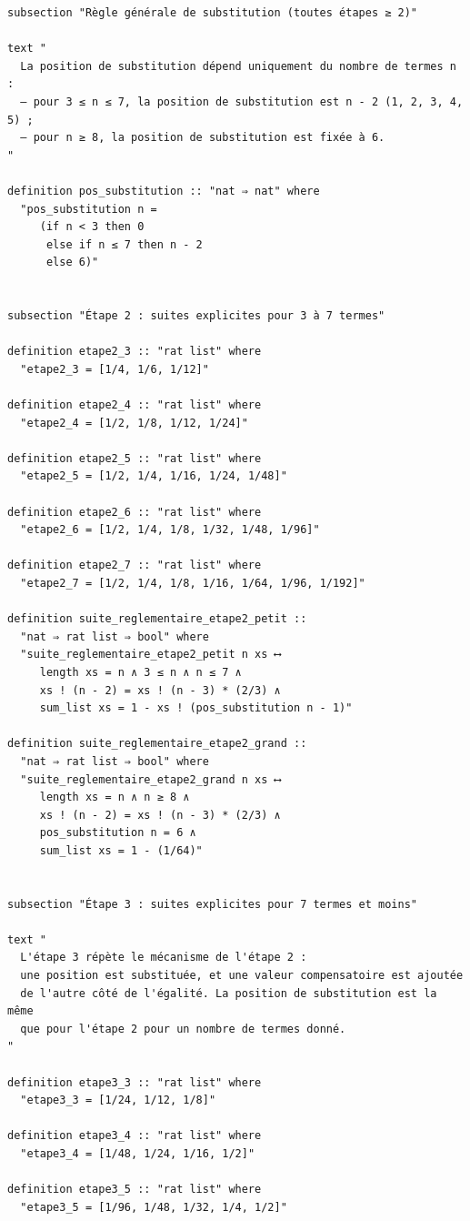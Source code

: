 \documentclass[a4paper,11pt]{article}
\begin{document}
\begin{holcode}[title={\textcolor{white}{File: methode\_de\_philippot.thy -- COMPLETE}}]
\begin{lstlisting}
subsection "Règle générale de substitution (toutes étapes ≥ 2)"

text "
  La position de substitution dépend uniquement du nombre de termes n :
  – pour 3 ≤ n ≤ 7, la position de substitution est n - 2 (1, 2, 3, 4, 5) ;
  – pour n ≥ 8, la position de substitution est fixée à 6.
"

definition pos_substitution :: "nat ⇒ nat" where
  "pos_substitution n =
     (if n < 3 then 0
      else if n ≤ 7 then n - 2
      else 6)"


subsection "Étape 2 : suites explicites pour 3 à 7 termes"

definition etape2_3 :: "rat list" where
  "etape2_3 = [1/4, 1/6, 1/12]"

definition etape2_4 :: "rat list" where
  "etape2_4 = [1/2, 1/8, 1/12, 1/24]"

definition etape2_5 :: "rat list" where
  "etape2_5 = [1/2, 1/4, 1/16, 1/24, 1/48]"

definition etape2_6 :: "rat list" where
  "etape2_6 = [1/2, 1/4, 1/8, 1/32, 1/48, 1/96]"

definition etape2_7 :: "rat list" where
  "etape2_7 = [1/2, 1/4, 1/8, 1/16, 1/64, 1/96, 1/192]"

definition suite_reglementaire_etape2_petit ::
  "nat ⇒ rat list ⇒ bool" where
  "suite_reglementaire_etape2_petit n xs ⟷
     length xs = n ∧ 3 ≤ n ∧ n ≤ 7 ∧
     xs ! (n - 2) = xs ! (n - 3) * (2/3) ∧
     sum_list xs = 1 - xs ! (pos_substitution n - 1)"

definition suite_reglementaire_etape2_grand ::
  "nat ⇒ rat list ⇒ bool" where
  "suite_reglementaire_etape2_grand n xs ⟷
     length xs = n ∧ n ≥ 8 ∧
     xs ! (n - 2) = xs ! (n - 3) * (2/3) ∧
     pos_substitution n = 6 ∧
     sum_list xs = 1 - (1/64)"


subsection "Étape 3 : suites explicites pour 7 termes et moins"

text "
  L'étape 3 répète le mécanisme de l'étape 2 :
  une position est substituée, et une valeur compensatoire est ajoutée
  de l'autre côté de l'égalité. La position de substitution est la même
  que pour l'étape 2 pour un nombre de termes donné.
"

definition etape3_3 :: "rat list" where
  "etape3_3 = [1/24, 1/12, 1/8]"

definition etape3_4 :: "rat list" where
  "etape3_4 = [1/48, 1/24, 1/16, 1/2]"

definition etape3_5 :: "rat list" where
  "etape3_5 = [1/96, 1/48, 1/32, 1/4, 1/2]"


\end{lstlisting}
\end{holcode}
\end{document}
